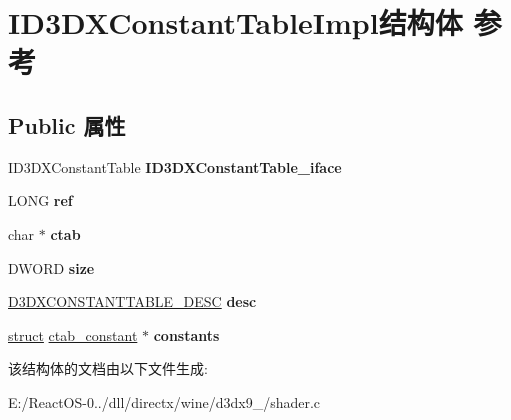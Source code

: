 \hypertarget{struct_i_d3_d_x_constant_table_impl}{}\section{I\+D3\+D\+X\+Constant\+Table\+Impl结构体 参考}
\label{struct_i_d3_d_x_constant_table_impl}
\subsection*{Public 属性}
\begin{DoxyCompactItemize}
\item 
\mbox{\label{struct_i_d3_d_x_constant_table_impl_a15f8a06a2ba7a3e5a14eb685c445b012}} 
I\+D3\+D\+X\+Constant\+Table {\bfseries I\+D3\+D\+X\+Constant\+Table\+\_\+iface}
\item 
\mbox{\label{struct_i_d3_d_x_constant_table_impl_a6ac9f8858b62ff09bd21c3c8eff51d2b}} 
L\+O\+NG {\bfseries ref}
\item 
\mbox{\label{struct_i_d3_d_x_constant_table_impl_a42d4f9e02915c74fc6e571308977d67a}} 
char $\ast$ {\bfseries ctab}
\item 
\mbox{\label{struct_i_d3_d_x_constant_table_impl_a5d4f0df70eb17e7e25383d5ea37c66b8}} 
D\+W\+O\+RD {\bfseries size}
\item 
\mbox{\label{struct_i_d3_d_x_constant_table_impl_ad76339d088cab9ea49108c7acb83017a}} 
\hyperlink{struct___d3_d_x_c_o_n_s_t_a_n_t_t_a_b_l_e___d_e_s_c}{D3\+D\+X\+C\+O\+N\+S\+T\+A\+N\+T\+T\+A\+B\+L\+E\+\_\+\+D\+E\+SC} {\bfseries desc}
\item 
\mbox{\label{struct_i_d3_d_x_constant_table_impl_ad2e9984cc758fc7ce4a4fe20ce1f7c67}} 
\hyperlink{interfacestruct}{struct} \hyperlink{structctab__constant}{ctab\+\_\+constant} $\ast$ {\bfseries constants}
\end{DoxyCompactItemize}


该结构体的文档由以下文件生成\+:\begin{DoxyCompactItemize}
\item 
E\+:/\+React\+O\+S-\/0../dll/directx/wine/d3dx9\+\_/shader.\+c\end{DoxyCompactItemize}

